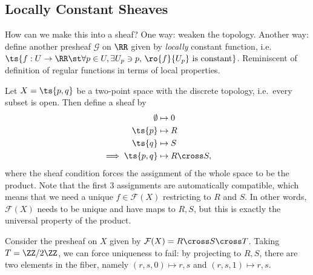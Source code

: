 \hypertarget{locally-constant-sheaves}{%
\subsection{Locally Constant Sheaves}\label{locally-constant-sheaves}}

How can we make this into a sheaf? One way: weaken the topology. Another
way: define another presheaf \(\mathcal{G}\) on \(\RR\) given by
\emph{locally} constant function,
i.e.~\(\ts{f: U\to \RR \st \forall p\in U, \exists U_p\ni p,\, \ro{f}{U_p} \text{ is constant}}\).
Reminiscent of definition of regular functions in terms of local
properties.

\begin{example}

Let \(X = \ts{p, q}\) be a two-point space with the discrete topology,
i.e.~every subset is open. Then define a sheaf by
\begin{align*}  
\emptyset &\mapsto 0 \\
\ts{p} &\mapsto R \\
\ts{q} &\mapsto S \\
\implies \ts{p, q} &\mapsto R\cross S
,\end{align*} where the sheaf condition forces the assignment of the
whole space to be the product. Note that the first 3 assignments are
automatically compatible, which means that we need a unique
\(f\in \mathcal{F}(X)\) restricting to \(R\) and \(S\). In other words,
\(\mathcal{F}(X)\) needs to be unique and have maps to \(R, S\), but
this is exactly the universal property of the product.

\end{example}

\begin{example}

Consider the presheaf on \(X\) given by
\(\mathcal{F}(X) = R\cross S \cross T\). Taking \(T = \ZZ/2\ZZ\), we can
force uniqueness to fail: by projecting to \(R, S\), there are two
elements in the fiber, namely \((r,s,0)\mapsto r,s\) and
\((r,s,1)\mapsto r,s\).

\end{example}

